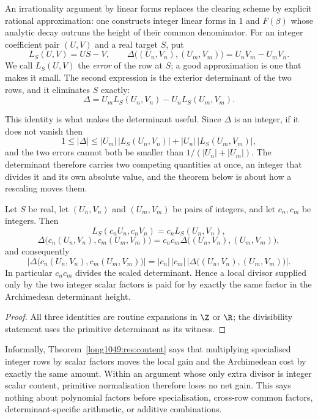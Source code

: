 An irrationality argument by linear forms replaces the clearing scheme by
explicit rational approximation: one constructs integer linear forms in $1$ and
$F(\beta)$ whose analytic decay outruns the height of their common denominator.
For an integer coefficient pair \((U,V)\) and a real target \(S\), put
\[
 L_S(U,V)=US-V,
 \qquad
 \Delta\bigl((U_n,V_n),(U_m,V_m)\bigr)=U_nV_m-U_mV_n.
\]
We call \(L_S(U,V)\) the \emph{error} of the row at \(S\); a good approximation
is one that makes it small.  The second expression is the exterior determinant
of the two rows, and it eliminates \(S\) exactly:
\[
\Delta=U_mL_S(U_n,V_n)-U_nL_S(U_m,V_m).
\]

This identity is what makes the determinant useful.  Since \(\Delta\) is an
integer, if it does not vanish then
\[
 1\le|\Delta|
  \le|U_m|\,\bigl|L_S(U_n,V_n)\bigr|+|U_n|\,\bigl|L_S(U_m,V_m)\bigr|,
\]
and the two errors cannot both be smaller than
\(1/(|U_n|+|U_m|)\).  The determinant therefore carries two competing
quantities at once, an integer that divides it and its own absolute value, and
the theorem below is about how a rescaling moves them.

\begin{theorem}\label{long1049:res:content}
Let \(S\) be real, let \((U_n,V_n)\) and \((U_m,V_m)\) be pairs of integers, and
let \(c_n,c_m\) be integers.  Then
\[
 L_S(c_nU_n,c_nV_n)=c_nL_S(U_n,V_n),
\]
\[
 \Delta\bigl(c_n(U_n,V_n),c_m(U_m,V_m)\bigr)
 =c_nc_m\Delta\bigl((U_n,V_n),(U_m,V_m)\bigr),
\]
and consequently
\[
 \left|\Delta\bigl(c_n(U_n,V_n),c_m(U_m,V_m)\bigr)\right|
 =|c_n|\,|c_m|\,
   \left|\Delta\bigl((U_n,V_n),(U_m,V_m)\bigr)\right|.
\]
In particular \(c_nc_m\) divides the scaled determinant.  Hence a local
divisor supplied only by the two integer scalar factors is paid for by exactly
the same factor in the Archimedean determinant height.
\end{theorem}

\begin{proof}
All three identities are routine expansions in \(\Z\) or \(\R\); the
divisibility statement uses the primitive determinant as its witness.
\end{proof}

Informally, Theorem~\ref{long1049:res:content} says that multiplying specialised integer
rows by scalar factors moves the local gain and the Archimedean cost by exactly
the same amount.  Within an argument whose only extra divisor is integer scalar
content, primitive normalisation therefore loses no net gain.  This says
nothing about polynomial factors before specialisation, cross-row common
factors, determinant-specific arithmetic, or additive combinations.

